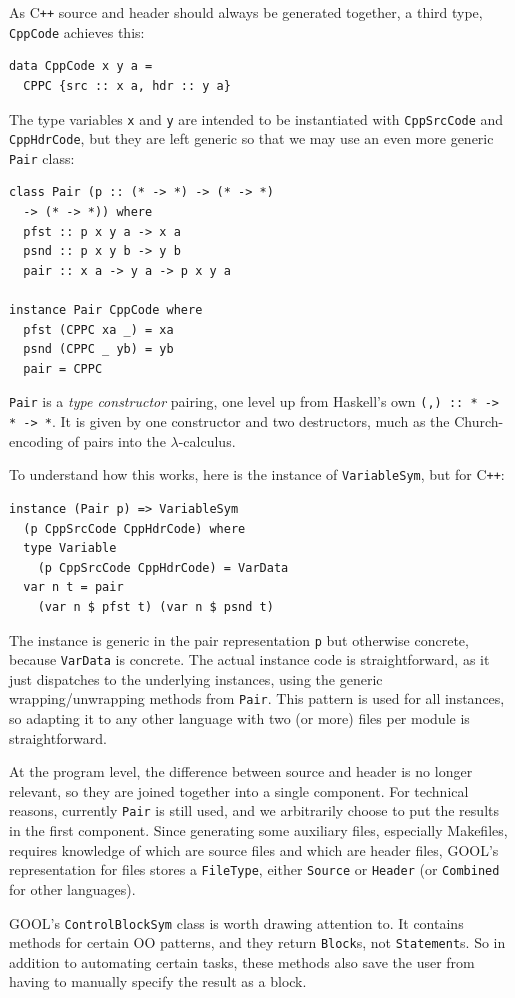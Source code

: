\documentclass[sigplan,review,anonymous,prologue,dvipsnames]{acmart}
\newcommand{\Cplusplus}{C\texttt{++}}
\begin{document}
As \Cplusplus{} source and header should always be generated together, a third
type, \verb|CppCode| achieves this:
\begin{lstlisting}
data CppCode x y a =
  CPPC {src :: x a, hdr :: y a}
\end{lstlisting}
The type variables \verb|x| and \verb|y| are intended to be instantiated with
\verb|CppSrcCode| and \verb|CppHdrCode|, but they are left generic
so that we may use an even more generic \verb|Pair| class:
\begin{lstlisting}
class Pair (p :: (* -> *) -> (* -> *)
  -> (* -> *)) where
  pfst :: p x y a -> x a
  psnd :: p x y b -> y b
  pair :: x a -> y a -> p x y a

instance Pair CppCode where
  pfst (CPPC xa _) = xa
  psnd (CPPC _ yb) = yb
  pair = CPPC
\end{lstlisting}
\verb|Pair| is a \emph{type constructor} pairing, one level up from
Haskell's own \verb|(,) :: * -> * -> *|.  It is given by one constructor
and two destructors, much as the Church-encoding of pairs into the
$\lambda$-calculus.

To understand how this works, here is the instance of \verb|VariableSym|,
but for \Cplusplus:
\begin{lstlisting}
instance (Pair p) => VariableSym 
  (p CppSrcCode CppHdrCode) where
  type Variable 
    (p CppSrcCode CppHdrCode) = VarData
  var n t = pair 
    (var n $ pfst t) (var n $ psnd t)
\end{lstlisting}
The instance is generic in the pair representation \verb|p| but
otherwise concrete, because \verb|VarData| is concrete. The actual
instance code is straightforward, as it just dispatches to the 
underlying instances, using the generic wrapping/unwrapping
methods from \verb|Pair|.  This pattern is used for all instances,
so adapting it to any other language with two (or more) files per
module is straightforward.

At the program level, the difference between source and header is no
longer relevant, so they are joined together into a single component.
For technical reasons, currently \verb|Pair| is still used, and we arbitrarily
choose to put the results in the first component. Since generating some 
auxiliary files, especially Makefiles, requires knowledge of which are source 
files and which are header files, GOOL's representation for files stores a 
\verb|FileType|, either \verb|Source| or \verb|Header| (or \verb|Combined| for 
other languages).

GOOL's \verb|ControlBlockSym| class is worth drawing attention to. 
It contains methods for certain OO patterns, and they return \verb|Block|s, not 
\verb|Statement|s. So in addition to automating certain tasks, these methods 
also save the user from having to manually specify the result as a block.
\end{document}
